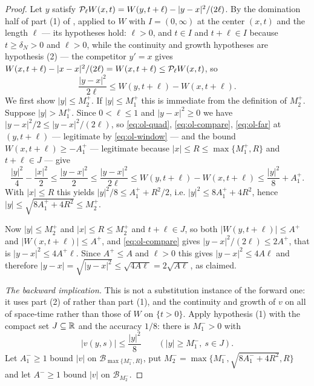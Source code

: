 \begin{proof}
Let $y$ satisfy $\mathcal{P}_\ell W(x,t)=W(y,t+\ell)-|y-x|^2/(2\ell)$. By the
domination half of part (1) of , applied to
$W$ with $I=(0,\infty)$ at the center $(x,t)$ and the length $\ell$ --- its
hypotheses hold: $\ell>0$, and $t\in I$ and $t+\ell\in I$ because
$t\ge\delta_N>0$ and $\ell>0$, while the continuity and growth hypotheses are
hypothesis (2) --- the competitor $y'=x$ gives
$W(x,t+\ell)-|x-x|^2/(2\ell)=W(x,t+\ell)\le\mathcal{P}_\ell W(x,t)$, so
\begin{equation}\label{eq:ol-compare}
  \frac{|y-x|^2}{2\ell}\le W(y,t+\ell)-W(x,t+\ell).
\end{equation}
We first show $|y|\le M^+_2$. If $|y|\le M^+_1$ this is immediate from the
definition of $M^+_2$. Suppose $|y|>M^+_1$. Since $0<\ell\le1$ and
$|y-x|^2\ge0$ we have $|y-x|^2/2\le|y-x|^2/(2\ell)$, so \eqref{eq:ol-quad},
\eqref{eq:ol-compare}, \eqref{eq:ol-far} at $(y,t+\ell)$ --- legitimate by
\eqref{eq:ol-window} --- and the bound $W(x,t+\ell)\ge-A^+_1$ --- legitimate
because $|x|\le R\le\max\{M^+_1,R\}$ and $t+\ell\in J$ --- give
\[
  \frac{|y|^2}{4}-\frac{|x|^2}{2}
   \le\frac{|y-x|^2}{2}
   \le\frac{|y-x|^2}{2\ell}
   \le W(y,t+\ell)-W(x,t+\ell)
   \le\frac{|y|^2}{8}+A^+_1 .
\]
With $|x|\le R$ this yields $|y|^2/8\le A^+_1+R^2/2$, i.e.
$|y|^2\le8A^+_1+4R^2$, hence $|y|\le\sqrt{8A^+_1+4R^2}\le M^+_2$.

Now $|y|\le M^+_2$ and $|x|\le R\le M^+_2$ and $t+\ell\in J$, so both
$|W(y,t+\ell)|\le A^+$ and $|W(x,t+\ell)|\le A^+$, and \eqref{eq:ol-compare}
gives $|y-x|^2/(2\ell)\le2A^+$, that is $|y-x|^2\le4A^+\ell$. Since
$A^+\le A$ and $\ell>0$ this gives $|y-x|^2\le4A\ell$ and therefore
$|y-x|=\sqrt{|y-x|^2}\le\sqrt{4A\ell}=2\sqrt{A\ell}$, as claimed.

\emph{The backward implication.} This is not a substitution instance of the
forward one: it uses part (2) of  rather than
part (1), and the continuity and growth of $v$ on all of space-time rather than
those of $W$ on $\{t>0\}$. Apply hypothesis (1) with the compact set
$J\subseteq\mathbb{R}$ and the accuracy $1/8$: there is $M^-_1>0$ with
\begin{equation}\label{eq:ol-far-v}
  |v(y,s)|\le\frac{|y|^2}{8}\qquad(|y|\ge M^-_1,\ s\in J).
\end{equation}
Let $A^-_1\ge1$ bound $|v|$ on $\mathcal B_{\max\{M^-_1,R\}}$, put
$M^-_2=\max\{M^-_1,\sqrt{8A^-_1+4R^2},R\}$ and let $A^-\ge1$ bound $|v|$ on
$\mathcal B_{M^-_2}$.


\end{proof}
